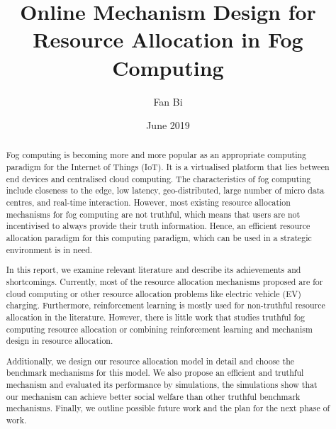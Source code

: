 \documentclass[11pt]{phdthesis}
\begin{document}
\frontmatter
\title      {Online Mechanism Design for Resource Allocation in Fog Computing}
\date       {June 2019}
\author     {Fan Bi}

\maketitle

\begin{abstract}
Fog computing is becoming more and more popular as an appropriate computing paradigm for the Internet of Things (IoT). It is a virtualised platform that lies between end devices and centralised cloud computing. The characteristics of fog computing include closeness to the edge, low latency, geo-distributed,  large number of micro data centres, and real-time interaction. However, most existing resource allocation mechanisms for fog computing are not truthful, which means that users are not incentivised to always provide their truth information. Hence, an efficient resource allocation paradigm for this computing paradigm, which can be used in a strategic environment is in need. 

In this report, we examine relevant literature and describe its achievements and shortcomings. Currently, most of the resource allocation mechanisms proposed are for cloud computing or other resource allocation problems like electric vehicle (EV) charging. Furthermore, reinforcement learning is mostly used for non-truthful resource allocation in the literature. However, there is little work that studies truthful fog computing resource allocation or combining reinforcement learning and mechanism design in resource allocation.

Additionally, we design our resource allocation model in detail and choose the benchmark mechanisms for this model. We also propose an efficient and truthful mechanism and evaluated its performance by simulations, the simulations show that our mechanism can achieve better social welfare than other truthful benchmark mechanisms. Finally, we outline possible future work and the plan for the next phase of work.
\end{abstract}

\tableofcontents
\end{document}
